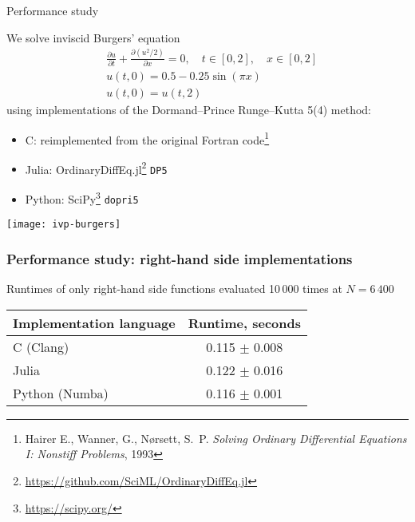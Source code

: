 \documentclass[
  10pt,
  aspectratio=169,
  english,
]{beamer}
\begin{document}
\begin{frame}{Performance study}
  \begin{minipage}{\dimexpr0.6\textwidth - 2\tabcolsep}
    We solve inviscid Burgers' equation
    \begin{align*}
       & \frac{\partial u}{\partial t} + \frac{\partial \left( u^{2} / 2 \right)}{\partial x} = 0,
      \quad t \in [0, 2], \quad x \in [0, 2]                                                       \\
       & u(t, 0) = 0.5 - 0.25 \sin \left( \pi x \right)                                            \\
       & u(t, 0) = u(t, 2)
    \end{align*}
    using implementations of the Dormand--Prince Runge--Kutta 5(4) method:
    \begin{itemize}
      \item C: reimplemented from the original Fortran code\footnote{%
              Hairer E., Wanner, G., Nørsett, S.\ P.
              \emph{Solving Ordinary Differential Equations I: Nonstiff Problems}, 1993}
      \item Julia: OrdinaryDiffEq.jl\footnote{%
              \url{https://github.com/SciML/OrdinaryDiffEq.jl}} \texttt{DP5}
      \item Python: SciPy\footnote{\url{https://scipy.org/}} \texttt{dopri5}
    \end{itemize}
  \end{minipage}\hfill
  \begin{minipage}{\dimexpr0.4\textwidth - 2\tabcolsep}
    \texttt{[image: ivp-burgers]}
  \end{minipage}
\end{frame}

\begin{frame}
  \frametitle{Performance study: right-hand side implementations}

  \centering
  Runtimes of only right-hand side functions
  evaluated 10\,000 times at $N=6\,400$
  \vspace{1em}

  \begin{tabular}{l c}
    \toprule
    Implementation language & Runtime, seconds    \\
    \midrule
    C (Clang)               & 0.115 \(\pm\) 0.008 \\
    Julia                   & 0.122 \(\pm\) 0.016 \\
    Python (Numba)          & 0.116 \(\pm\) 0.001 \\
    \bottomrule
  \end{tabular}
\end{frame}
\end{document}
